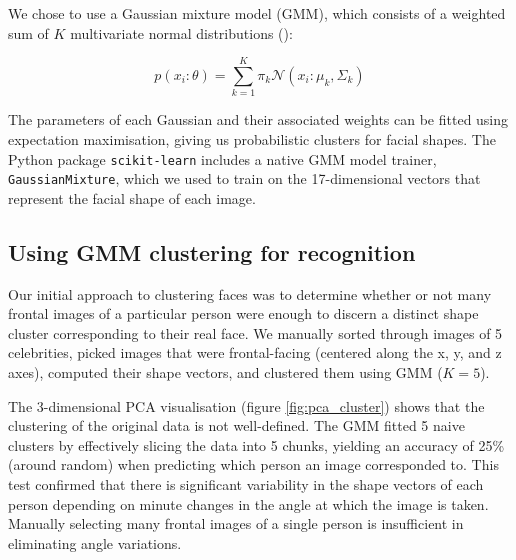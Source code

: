 \documentclass{article}
\begin{document}
We chose to use a Gaussian mixture model (GMM), which consists of a weighted sum
of $K$ multivariate normal distributions (\cite{murphy}):

\[p(x_i : \theta) = \sum_{k=1}^K \pi_k \mathcal{N}(x_i : \mu_k, \Sigma_k)\]

The parameters of each Gaussian and their associated weights can be fitted using
expectation maximisation, giving us probabilistic clusters for facial shapes.
The Python package \texttt{scikit-learn} includes a native GMM model trainer,
\texttt{GaussianMixture}, which we used to train on the 17-dimensional vectors
that represent the facial shape of each image.

\subsection{Using GMM clustering for recognition}
\label{section:cluster_initial}

Our initial approach to clustering faces was to determine whether or not many
frontal images of a particular person were enough to discern a distinct shape
cluster corresponding to their real face. We manually sorted through images of 5
celebrities, picked images that were frontal-facing (centered along the x, y,
and z axes), computed their shape vectors, and clustered them using GMM ($K =
5$).

The 3-dimensional PCA visualisation (figure \ref{fig:pca_cluster}) shows that
the clustering of the original data is not well-defined. The GMM fitted 5 naive
clusters by effectively slicing the data into 5 chunks, yielding an accuracy of
25\% (around random) when predicting which person an image corresponded to. This
test confirmed that there is significant variability in the shape vectors of
each person depending on minute changes in the angle at which the image is
taken. Manually selecting many frontal images of a single person is insufficient
in eliminating angle variations.
\end{document}
